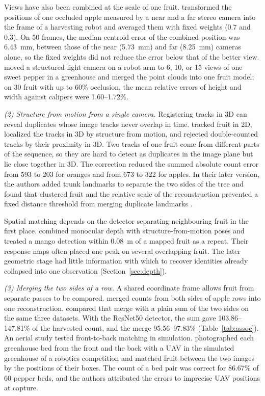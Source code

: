 Views have also been combined at the scale of one fruit. \citet{li2022multi} transformed the positions of one occluded apple measured by a near and a far stereo camera into the frame of a harvesting robot and averaged them with fixed weights (0.7 and 0.3). On 50 frames, the median centroid error of the combined position was 6.43~mm, between those of the near (5.73~mm) and far (8.25~mm) cameras alone, so the fixed weights did not reduce the error below that of the better view. \citet{wang2024multi} moved a structured-light camera on a robot arm to 6, 10, or 15 views of one sweet pepper in a greenhouse and merged the point clouds into one fruit model; on 30 fruit with up to 60\% occlusion, the mean relative errors of height and width against calipers were 1.60--1.72\%.

\textit{(2) Structure from motion from a single camera.} Registering tracks in 3D can reveal duplicates whose image tracks never overlap in time. \citet{liu2018robust} tracked fruit in 2D, localized the tracks in 3D by structure from motion, and rejected double-counted tracks by their proximity in 3D. Two tracks of one fruit come from different parts of the sequence, so they are hard to detect as duplicates in the image plane but lie close together in 3D. The correction reduced the summed absolute count error from 593 to 203 for oranges and from 673 to 322 for apples. In their later version, the authors added trunk landmarks to separate the two sides of the tree and found that clustered fruit and the relative scale of the reconstruction prevented a fixed distance threshold from merging duplicate landmarks \citep{liu2019monocular}.

Spatial matching depends on the detector separating neighbouring fruit in the first place. \citet{bellocchio2022novel} combined monocular depth with structure-from-motion poses and treated a mango detection within 0.08~m of a mapped fruit as a repeat. Their response maps often placed one peak on several overlapping fruit. The later geometric stage had little information with which to recover identities already collapsed into one observation (Section~\ref{sec:depth}).

\textit{(3) Merging the two sides of a row.} A shared coordinate frame allows fruit from separate passes to be compared. \citet{roy2019vision} merged counts from both sides of apple rows into one reconstruction. \citet{hani2020comparative} compared that merge with a plain sum of the two sides on the same three datasets. With the ResNet50 detector, the sum gave 103.86--147.81\% of the harvested count, and the merge 95.56--97.83\% (Table~\ref{tab:assoc}). An aerial study tested front-to-back matching in simulation. \citet{vasconcelos2024uav} photographed each greenhouse bed from the front and the back with a UAV in the simulated greenhouse of a robotics competition and matched fruit between the two images by the positions of their boxes. The count of a bed pair was correct for 86.67\% of 60 pepper beds, and the authors attributed the errors to imprecise UAV positions at capture.

